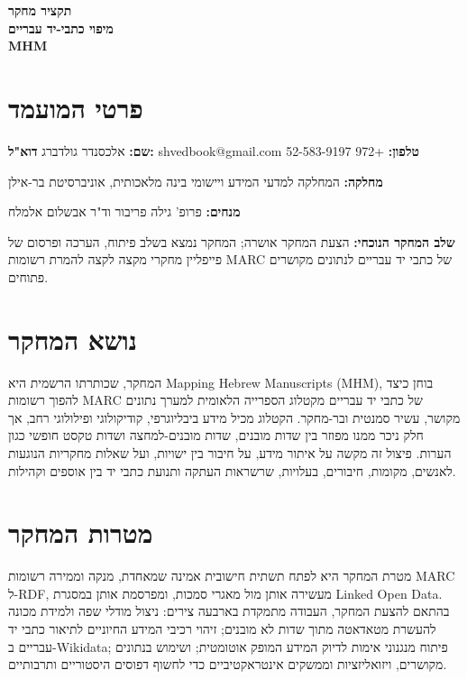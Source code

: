 \documentclass[10pt,a4paper]{article}
\newcommand{\fieldlabel}[1]{\textbf{\color{Accent}#1}}
\begin{document}
\begin{center}
{\LARGE\bfseries תקציר מחקר}\\[2pt]
{\Large\bfseries מיפוי כתבי-יד עבריים}\\[-1pt]
{\large\bfseries \textenglish{MHM}}
\end{center}

\section*{פרטי המועמד}
\fieldlabel{שם:} אלכסנדר גולדברג \quad
\fieldlabel{דוא"ל:} \textenglish{shvedbook@gmail.com} \quad
\fieldlabel{טלפון:} \textenglish{+972 52-583-9197}

\fieldlabel{מחלקה:} המחלקה למדעי המידע ויישומי בינה מלאכותית, אוניברסיטת בר-אילן

\fieldlabel{מנחים:} פרופ' גילה פריבור וד"ר אבשלום אלמלח

\fieldlabel{שלב המחקר הנוכחי:} הצעת המחקר אושרה; המחקר נמצא בשלב פיתוח, הערכה ופרסום של פייפליין מחקרי מקצה לקצה להמרת רשומות \textenglish{MARC} של כתבי יד עבריים לנתונים מקושרים פתוחים.

\section*{נושא המחקר}
המחקר, שכותרתו הרשמית היא \textenglish{Mapping Hebrew Manuscripts (MHM)}, בוחן כיצד להפוך רשומות \textenglish{MARC} של כתבי יד עבריים מקטלוג הספרייה הלאומית למערך נתונים מקושר, עשיר סמנטית ובר-מחקר. הקטלוג מכיל מידע ביבליוגרפי, קודיקולוגי ופילולוגי רחב, אך חלק ניכר ממנו מפוזר בין שדות מובנים, שדות מובנים-למחצה ושדות טקסט חופשי כגון הערות. פיצול זה מקשה על איתור מידע, על חיבור בין ישויות, ועל שאלות מחקריות הנוגעות לאנשים, מקומות, חיבורים, בעלויות, שרשראות העתקה ותנועת כתבי יד בין אוספים וקהילות.

\section*{מטרות המחקר}
מטרת המחקר היא לפתח תשתית חישובית אמינה שמאחדת, מנקה וממירה רשומות \textenglish{MARC} ל-\textenglish{RDF}, מעשירה אותן מול מאגרי סמכות, ומפרסמת אותן במסגרת \textenglish{Linked Open Data}. בהתאם להצעת המחקר, העבודה מתמקדת בארבעה צירים: ניצול מודלי שפה ולמידת מכונה להעשרת מטאדאטה מתוך שדות לא מובנים; זיהוי רכיבי המידע החיוניים לתיאור כתבי יד עבריים ב-\textenglish{Wikidata}; פיתוח מנגנוני אימות לדיוק המידע המופק אוטומטית; ושימוש בנתונים מקושרים, ויזואליזציות וממשקים אינטראקטיביים כדי לחשוף דפוסים היסטוריים ותרבותיים.
\end{document}
